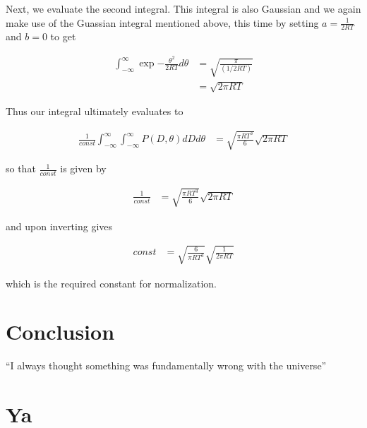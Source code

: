 \documentclass{article}
\begin{document}
Next, we evaluate the second integral. This integral is also Gaussian and we again make use of the Guassian integral mentioned above, this time by setting $a = \frac{1}{2RT}$ and $b = 0$ to get 

\begin{align*}
    \int_{-\infty}^{\infty} \exp{ - \frac{\theta ^2}{2RT} } d\theta &= \sqrt{\frac{\pi}{(1/2RT)}} \\
    &= \sqrt{2\pi RT} 
\end{align*}

Thus our integral ultimately evaluates to 

\begin{align*}
    \frac{1}{const} \int_{-\infty}^{\infty} \int_{-\infty}^{\infty} P(D,\theta)dD d\theta &= \sqrt{\frac{\pi RT^3}{6 }} \sqrt{2\pi RT}     
\end{align*}

so that $\frac{1}{const}$ is given by

\begin{align*}
    \frac{1}{const} &= \sqrt{\frac{\pi RT^3}{6}} \sqrt{2\pi RT}     
\end{align*}

and upon inverting gives 

\begin{align*}
    const &= \sqrt{\frac{6}{\pi RT^3}} \sqrt{\frac{1}{2\pi RT}}     
\end{align*}

which is the required constant for normalization. 


\section{Conclusion}
``I always thought something was fundamentally wrong with the universe'' \citep{adams1995hitchhiker}

\section{Ya}



\end{document}
